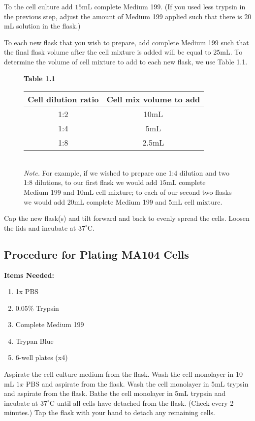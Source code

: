 To the cell culture add $15$mL complete Medium 199. (If you used less trypsin in the previous step, adjust the amount of Medium 199 applied such that there is $20$mL solution in the flask.)

To each new flask that you wish to prepare, add complete Medium 199 such that the final flask volume after the cell mixture is added will be equal to $25$mL. To determine the volume of cell mixture to add to each new flask, we use Table 1.1.

\begin{figure}[htp]
{\bfseries Table 1.1}\\[0.1cm]
\begin{tabular*}{\textwidth}{c c}
\hline
Cell dilution ratio & Cell mix volume to add \\
\hline
1:2 & 10mL \\
1:4 & 5mL \\
1:8 & 2.5mL \\
\hline
\end{tabular*}\\[0.1cm]
{\small {\itshape Note.} For example, if we wished to prepare one 1:4 dilution and two 1:8 dilutions, to our first flask we would add $15$mL complete Medium 199 and 10mL cell mixture; to each of our second two flasks we would add $20$mL complete Medium 199 and $5$mL cell mixture.}
\end{figure}

Cap the new flask(s) and tilt forward and back to evenly spread the cells. Loosen the lids and incubate at $37^{\circ}$C.

\subsection{Procedure for Plating MA104 Cells}

{\bfseries Items Needed:} \begin{enumerate}
	\item 1x PBS
	\item 0.05\% Trypsin
	\item Complete Medium 199
	\item Trypan Blue
	\item 6-well plates (x4)
\end{enumerate}

Aspirate the cell culture medium from the flask. Wash the cell monolayer in $10$mL $1x$ PBS and aspirate from the flask. Wash the cell monolayer in 5mL trypsin and aspirate from the flask. Bathe the cell monolayer in 5mL trypsin and incubate at $37^{\circ}$C until all cells have detached from the flask. (Check every 2 minutes.) Tap the flask with your hand to detach any remaining cells.

